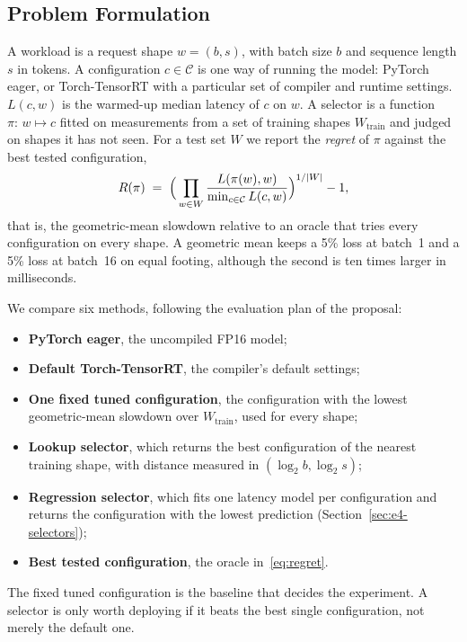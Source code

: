 \subsection{Problem Formulation}
\label{sec:e4-problem}

A workload is a request shape $w=(b,s)$, with batch size $b$ and sequence
length $s$ in tokens. A configuration $c \in \mathcal{C}$ is one way of running
the model: PyTorch eager, or Torch-TensorRT with a particular set of compiler
and runtime settings. $L(c,w)$ is the warmed-up median latency of $c$ on $w$. A
selector is a function $\pi:\,w \mapsto c$ fitted on measurements from a set of
training shapes $W_\mathrm{train}$ and judged on shapes it has not seen. For a
test set $W$ we report the \emph{regret} of $\pi$ against the best tested
configuration,
\begin{equation}
  R(\pi) \;=\;
  \Bigl(\,\prod_{w\in W}
     \frac{L(\pi(w),w)}{\min_{c\in\mathcal{C}} L(c,w)}\Bigr)^{1/|W|} - 1 ,
  \label{eq:regret}
\end{equation}
that is, the geometric-mean slowdown relative to an oracle that tries every
configuration on every shape. A geometric mean keeps a 5\% loss at batch~1 and
a 5\% loss at batch~16 on equal footing, although the second is ten times
larger in milliseconds.

We compare six methods, following the evaluation plan of the proposal:
\begin{itemize}
  \item \textbf{PyTorch eager}, the uncompiled FP16 model;
  \item \textbf{Default Torch-TensorRT}, the compiler's default settings;
  \item \textbf{One fixed tuned configuration}, the configuration with the
        lowest geometric-mean slowdown over $W_\mathrm{train}$, used for every
        shape;
  \item \textbf{Lookup selector}, which returns the best configuration of the
        nearest training shape, with distance measured in
        $(\log_2 b,\log_2 s)$;
  \item \textbf{Regression selector}, which fits one latency model per
        configuration and returns the configuration with the lowest
        prediction (Section~\ref{sec:e4-selectors});
  \item \textbf{Best tested configuration}, the oracle in~\eqref{eq:regret}.
\end{itemize}
The fixed tuned configuration is the baseline that decides the experiment. A
selector is only worth deploying if it beats the best single configuration,
not merely the default one.

